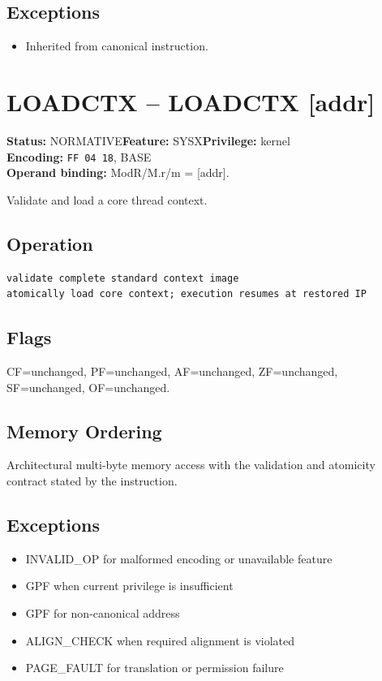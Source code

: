 \documentclass[10pt]{article}
\begin{document}
\subsection*{Exceptions}
\begin{itemize}
\item Inherited from canonical instruction.
\end{itemize}
\clearpage

\section{LOADCTX -- LOADCTX [addr]}
\textbf{Status:} NORMATIVE\quad \textbf{Feature:} SYSX\quad \textbf{Privilege:} kernel\\
\textbf{Encoding:} \texttt{FF 04 18}, BASE\\
\textbf{Operand binding:} ModR/M.r/m = [addr].

Validate and load a core thread context.

\subsection*{Operation}
\begin{lstlisting}
validate complete standard context image
atomically load core context; execution resumes at restored IP
\end{lstlisting}
\subsection*{Flags}
CF=unchanged, PF=unchanged, AF=unchanged, ZF=unchanged, SF=unchanged, OF=unchanged.
\subsection*{Memory Ordering}
Architectural multi-byte memory access with the validation and atomicity contract stated by the instruction.
\subsection*{Exceptions}
\begin{itemize}
\item INVALID\_OP for malformed encoding or unavailable feature
\item GPF when current privilege is insufficient
\item GPF for non-canonical address
\item ALIGN\_CHECK when required alignment is violated
\item PAGE\_FAULT for translation or permission failure
\end{itemize}
\clearpage
\end{document}
